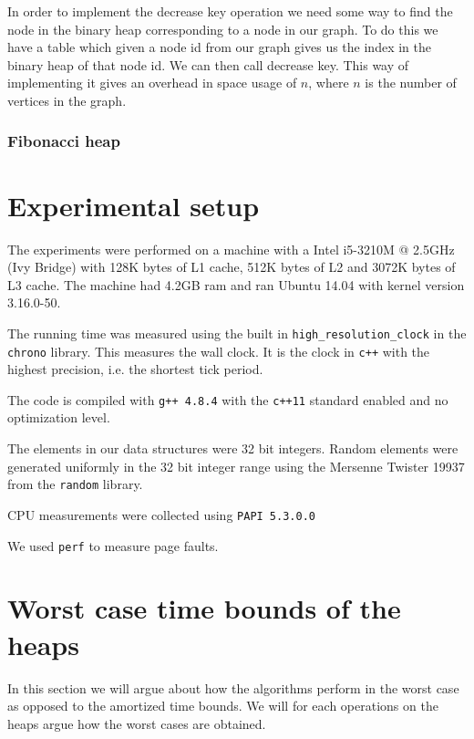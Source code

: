 \documentclass[a4paper,oneside,article,11pt]{memoir}
\begin{document}
In order to implement the decrease key operation we need some way to find the node in the binary heap corresponding to a node in our graph. To do this we have a table which given a node id from our graph gives us the index in the binary heap of that node id. We can then call decrease key. This way of implementing it gives an overhead in space usage of $n$, where $n$ is the number of vertices in the graph.

\subsection{Fibonacci heap}

\chapter{Experimental setup}

The experiments were performed on a machine with a Intel i5-3210M @ 2.5GHz (Ivy Bridge) with 128K bytes of L1 cache, 512K bytes of L2 and 3072K bytes of L3 cache. The machine had 4.2GB ram and ran Ubuntu 14.04 with kernel version 3.16.0-50.

The running time was measured using the built in \texttt{high\_resolution\_clock} in the \texttt{chrono} library. This measures the wall clock. It is the clock in \texttt{c++} with the highest precision, i.e. the shortest tick period.

The code is compiled with \texttt{g++ 4.8.4} with the \texttt{c++11} standard enabled and no optimization level.

The elements in our data structures were 32 bit integers. Random elements were generated uniformly in the 32 bit integer range using the Mersenne Twister 19937 from the \texttt{random} library.

CPU measurements were collected using \texttt{PAPI 5.3.0.0}

We used \texttt{perf} to measure page faults.


\chapter{Worst case time bounds of the heaps}
In this section we will argue about how the algorithms perform in the worst case as opposed to the amortized time bounds. We will for each operations on the heaps argue how the worst cases are obtained.
\end{document}
